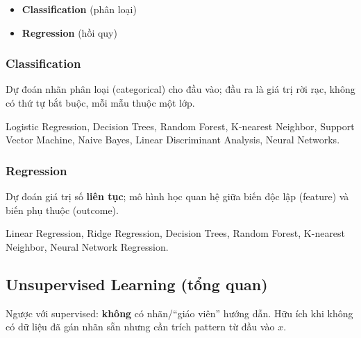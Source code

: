 \begin{phuongphap}[title={Hai nhóm tác vụ supervised}]
\begin{itemize}
  \item \textbf{Classification} (phân loại)
  \item \textbf{Regression} (hồi quy)
\end{itemize}
\end{phuongphap}

\subsubsection{Classification}

\begin{ynghia}[title={target}]
Dự đoán nhãn phân loại (categorical) cho đầu vào; đầu ra là giá trị rời rạc, không có thứ tự bắt buộc, mỗi mẫu thuộc một lớp.
\end{ynghia}

\begin{phuongphap}[title={Một số mô hình phân loại phổ biến}]
Logistic Regression, Decision Trees, Random Forest, K-nearest Neighbor, Support Vector Machine, Naive Bayes, Linear Discriminant Analysis, Neural Networks.
\end{phuongphap}

\subsubsection{Regression}

\begin{ynghia}[title={target}]
Dự đoán giá trị số \textbf{liên tục}; mô hình học quan hệ giữa biến độc lập (feature) và biến phụ thuộc (outcome).
\end{ynghia}

\begin{phuongphap}[title={Một số mô hình hồi quy phổ biến}]
Linear Regression, Ridge Regression, Decision Trees, Random Forest, K-nearest Neighbor, Neural Network Regression.
\end{phuongphap}

\subsection{Unsupervised Learning (tổng quan)}

\begin{dinhnghia}[title={Học không giám sát}]
Ngược với supervised: \textbf{không} có nhãn/``giáo viên'' hướng dẫn.
Hữu ích khi không có dữ liệu đã gán nhãn sẵn nhưng cần trích pattern từ đầu vào $x$.
\end{dinhnghia}

